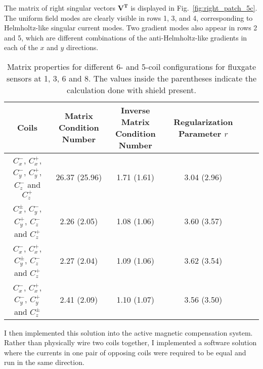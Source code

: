 
The matrix of right singular vectors $\bm{V^T}$ is displayed in
Fig.~\ref{fig:right_patch_5c}.  The uniform field modes are clearly
visible in rows 1, 3, and 4, corresponding to Helmholtz-like singular
current modes.  Two gradient modes also appear in rows 2 and 5, which
are different combinations of the anti-Helmholtz-like gradients in
each of the $x$ and $y$ directions.


\begin{table} [htb!]
    \centering
    \begin{tabular} { |c|c|c|c|c|c|} 
        \hline
        Coils & \makecell{Matrix \\Condition Number} &\makecell{Inverse Matrix \\ Condition Number} & \makecell{Regularization \\Parameter $r$}\\
        \hline\hline
        \makecell{$C_x^-$, $C_x^+$, $C_y^-$,\\ $C_y^+$, $C_z^-$ and $C_z^+$ } & 26.37 (25.96) & 1.71 (1.61) & 3.04 (2.96) \\ 
        \hline
        \makecell{$C_x^{\pm}$, $C_y^-$, $C_y^+$,\\ $C_z^-$ and $C_z^+$ } & 2.26 (2.05) & 1.08 (1.06) & 3.60 (3.57) \\         
        \hline
        \makecell{$C_x^-$, $C_x^+$, $C_y^\pm$,\\ $C_z^-$ and $C_z^+$ } & 2.27 (2.04) & 1.09 (1.06) & 3.62 (3.54) \\
        \hline
        \makecell{$C_x^-$, $C_x^+$, $C_y^-$,\\ $C_y^+$ and $C_z^\pm$ } & 2.41 (2.09) & 1.10 (1.07) & 3.56 (3.50) \\
        \hline

    \end{tabular}
    \caption[Properties for different coil configurations]{Matrix properties for different 6- and 5-coil configurations for fluxgate sensors at 1, 3, 6 and 8. The values inside the parentheses indicate the calculation done with shield present.}\label{table:mcond_coil}
\end{table}


I then implemented this solution into the active magnetic compensation
system.  Rather than physically wire two coils together, I implemented
a software solution where the currents in one pair of opposing coils
were required to be equal and run in the same direction.

